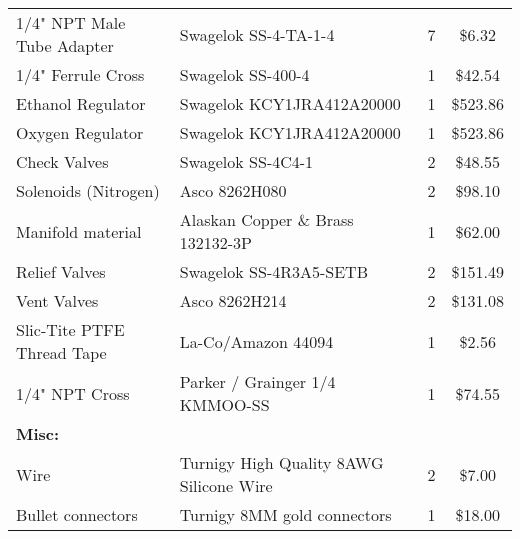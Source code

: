 \documentclass[11pt,twoside,a4paper,openright]{report}
\begin{document}
{\begin{tabular}{|llcc|}
1/4" NPT Male Tube Adapter&Swagelok SS-4-TA-1-4&7&\$6.32\\
1/4" Ferrule Cross&Swagelok SS-400-4&1&\$42.54\\
Ethanol Regulator&Swagelok KCY1JRA412A20000&1&\$523.86\\
Oxygen Regulator&Swagelok KCY1JRA412A20000&1&\$523.86\\
Check Valves&Swagelok SS-4C4-1&2&\$48.55\\
Solenoids (Nitrogen)&Asco 8262H080&2&\$98.10\\
Manifold material&Alaskan Copper \& Brass 132132-3P&1&\$62.00\\
Relief Valves&Swagelok SS-4R3A5-SETB&2&\$151.49\\
Vent Valves&Asco 8262H214&2&\$131.08\\
Slic-Tite PTFE Thread Tape&La-Co/Amazon 44094&1&\$2.56\\
1/4" NPT Cross&Parker / Grainger 1/4 KMMOO-SS&1&\$74.55\\
\textbf{Misc: }&&&\\
Wire&Turnigy High Quality 8AWG Silicone Wire&2&\$7.00\\
Bullet connectors&Turnigy 8MM gold connectors&1&\$18.00\\
 \hline
\end{tabular}}



\newpage
\end{document}
